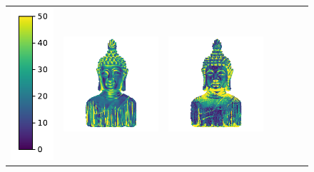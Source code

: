 \begin{figure}
\begin{tabular*}{\linewidth}{@{}c@{}c@{}c@{}c@{}c@{}c@{}c@{}}
\multicolumn{1}{r}{\includegraphics[height=\reswidth\linewidth]{figures/results/examples/colorbar_error_vertical.pdf}} &
\includegraphics[width=\reswidth\linewidth]{figures/results/examples/ours_buddha_errors.png} &
\includegraphics[width=\reswidth\linewidth]{figures/results/examples/jung_buddha_error.png} &

\end{tabular*}
\end{figure}
